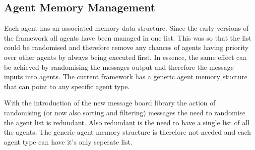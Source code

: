 \subsection{Agent Memory Management}

Each agent has an associated memory data structure. Since the early versions of the
framework all agents have been managed in one list. This was so that the list
could be randomised and therefore remove any chances of agents having priority
over other agents by always being executed first. In essence, the same effect can be achieved by randomising the messages output and therefore the message inputs into agents.
The current framework has a generic agent memory stucture that can point to any
specific agent type.

With the introduction of the new message board library the action of randomising
(or now also sorting and filtering) messages the need to randomise the agent list
is redundant. Also redundant is the need to have a single list of all the agents.
The generic agent memory structure is therefore not needed and each agent type
can have it's only seperate list.
